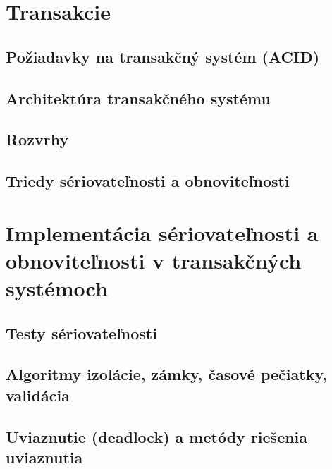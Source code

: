 \documentclass[10pt,a4paper]{article}
\begin{document}
\section{Transakcie}

\subsection{Požiadavky na transakčný systém (ACID)}

\subsection{Architektúra transakčného systému}

\subsection{Rozvrhy}

\subsection{Triedy sériovateľnosti a obnoviteľnosti}
    
\section{Implementácia sériovateľnosti a obnoviteľnosti v transakčných systémoch}
\subsection{Testy sériovateľnosti}

\subsection{Algoritmy izolácie, zámky, časové pečiatky, validácia}

\subsection{Uviaznutie (deadlock) a metódy riešenia uviaznutia}
\end{document}
